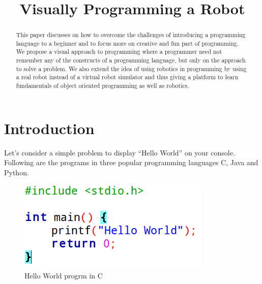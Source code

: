 \documentclass[conference]{IEEEtran}
\begin{document}
\renewcommand{\abstractname}{ABSTRACT}
\title{Visually Programming a Robot}

\author{
\and
{}
}
\maketitle
\thispagestyle{plain}
\pagestyle{plain}
\renewcommand{\headrulewidth}{0pt}
\renewcommand{\footrulewidth}{0pt}

\begin{abstract}
This paper discusses on how to overcome the challenges of introducing a programming language to a beginner and to focus more on creative and fun part of programming. We propose a visual approach to programming where a programmer need not remember any of the constructs of a programming language, but only on the approach to solve a problem. We also extend the idea of using robotics in programming by using a real robot instead of a virtual robot simulator and thus giving a platform to learn fundamentals of object oriented programming as well as robotics.
\end{abstract}

\section{Introduction}
Let’s consider a simple problem to display “Hello World” on your console. Following are the programs in three popular programming languages C, Java and Python.

\begin{figure}[h]
\includegraphics[scale=0.4]{Fig_01.png}
\caption{Hello World progrm in C}
\end{figure}
\end{document}
